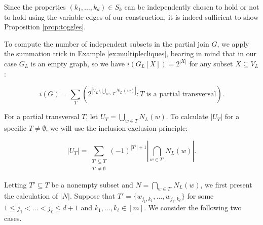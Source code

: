 \documentclass[10pt,a4paper]{article}
\numberwithin{equation}{section}
\begin{document}
Since the properties $(k_1, \dots, k_d)\in S_k$ can be independently chosen to hold or not to hold using the variable edges of our construction, it is indeed sufficient to show Proposition \ref{prop:toggles}.

To compute the number of independent subsets in the partial join $G$, we apply the summation trick in Example \ref{ex:multiplecliques}, bearing in mind that in our case $G_L$ is an empty graph, so we have $i(G_L[X])=2^{|X|}$ for any subset $X\subseteq V_L$:

\begin{equation}\label{eq:ig_as_sum}
i(G)=\sum_T (2^{|V_L\setminus \bigcup_{w\in T} N_L(w)|}: \text{$T$ is a partial transversal}).
\end{equation}

For a partial transversal $T$, let $U_T=\bigcup_{w\in T} N_L(w)$. To calculate $|U_T|$ for a specific $T\ne \emptyset$, we will use the inclusion-exclusion principle:

\begin{equation}\label{eq:inc_exc}
|U_T|=\sum_{\substack{T'\subseteq T\\ T'\ne\emptyset}} (-1)^{|T'|+1} \left|\bigcap_{w\in T'} N_L(w)\right|.
\end{equation}

Letting $T'\subseteq T$ be a nonempty subset and $N=\bigcap\limits_{w\in T'} N_L(w)$, we first present the calculation of $|N|$. Suppose that $T'=\{w_{j_1, k_1}, \ldots, w_{j_{\ell}, k_{\ell}}\}$ for some $1\le j_1 < \ldots<j_{\ell}\le d+1$ and $k_1,\ldots,k_{\ell}\in [m]$. We consider the following two cases.
\end{document}
